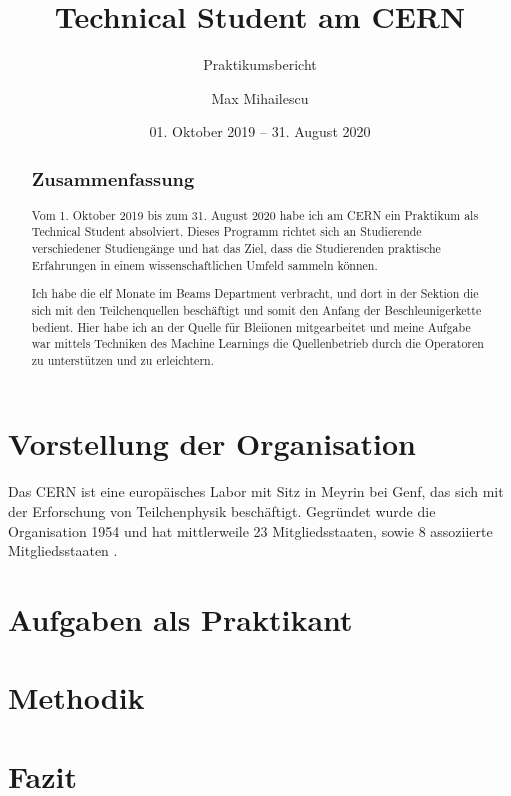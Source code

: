 \documentclass[11pt, a4paper, titlepage, headings=standardclasses]{scrartcl}
\author{Max Mihailescu}
\title{Technical Student am CERN}
\subtitle{Praktikumsbericht}
\date{01. Oktober 2019 -- 31. August 2020}
\begin{document}
\maketitle
{}

\begin{abstract}
	\subsection*{Zusammenfassung}
	\noindent Vom 1. Oktober 2019 bis zum 31. August 2020 habe ich am CERN ein Praktikum als Technical Student absolviert. Dieses Programm richtet sich an Studierende verschiedener Studiengänge und hat das Ziel, dass die Studierenden praktische Erfahrungen in einem wissenschaftlichen Umfeld sammeln können.
	
	Ich habe die elf Monate im Beams Department verbracht, und dort in der Sektion die sich mit den Teilchenquellen beschäftigt und somit den Anfang der Beschleunigerkette bedient. Hier habe ich an der Quelle für Bleiionen mitgearbeitet und meine Aufgabe war mittels Techniken des Machine Learnings die Quellenbetrieb durch die Operatoren zu unterstützen und zu erleichtern.
\end{abstract}

\section{Vorstellung der Organisation}
Das CERN ist eine europäisches Labor mit Sitz in Meyrin bei Genf, das sich mit der Erforschung von Teilchenphysik beschäftigt. Gegründet wurde die Organisation 1954 und hat mittlerweile 23 Mitgliedsstaaten, sowie 8 assoziierte Mitgliedsstaaten \cite{CERN:AnnualReport2019}.

\section{Aufgaben als Praktikant}


\section{Methodik}


\section{Fazit}

\printbibliography
\end{document}
